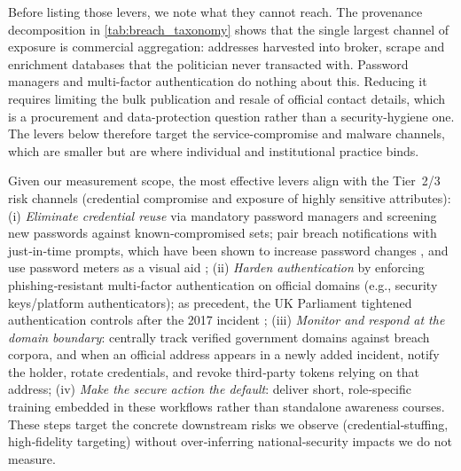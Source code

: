 \documentclass[12pt, letterpaper]{article}
\begin{document}
Before listing those levers, we note what they cannot reach. The provenance decomposition in \cref{tab:breach_taxonomy} shows that the single largest channel of exposure is commercial aggregation: addresses harvested into broker, scrape and enrichment databases that the politician never transacted with. Password managers and multi-factor authentication do nothing about this. Reducing it requires limiting the bulk publication and resale of official contact details, which is a procurement and data-protection question rather than a security-hygiene one. The levers below therefore target the service-compromise and malware channels, which are smaller but are where individual and institutional practice binds.

Given our measurement scope, the most effective levers align with the Tier~2/3 risk channels (credential compromise and exposure of highly sensitive attributes): (i) \emph{Eliminate credential reuse} via mandatory password managers and screening new passwords against known‑compromised sets; pair breach notifications with just‑in‑time prompts, which have been shown to increase password changes \citep{albayram2024investigating}, and use password meters as a visual aid \citep{pw_strength_meter}; (ii) \emph{Harden authentication} by enforcing phishing‑resistant multi‑factor authentication on official domains (e.g., security keys/platform authenticators); as precedent, the UK Parliament tightened authentication controls after the 2017 incident \citep{uk2017breach, uk2017breach_update}; (iii) \emph{Monitor and respond at the domain boundary}: centrally track verified government domains against breach corpora, and when an official address appears in a newly added incident, notify the holder, rotate credentials, and revoke third‑party tokens relying on that address; (iv) \emph{Make the secure action the default}: deliver short, role‑specific training embedded in these workflows rather than standalone awareness courses. These steps target the concrete downstream risks we observe (credential‑stuffing, high‑fidelity targeting) without over‑inferring national‑security impacts we do not measure.
\end{document}
